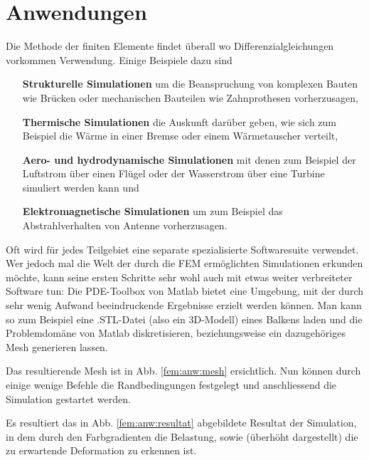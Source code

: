 %
%
%
%
\section{Anwendungen\label{fem:section:anwendungen}}

Die Methode der finiten Elemente findet überall wo Differenzialgleichungen vorkommen Verwendung.
Einige Beispiele dazu sind
\begin{itemize}
    \item [\textbf{Strukturelle Simulationen}] um die Beanspruchung von komplexen Bauten wie Brücken oder mechanischen Bauteilen wie Zahnprothesen vorherzusagen,
    \item [\textbf{Thermische Simulationen}] die Auskunft darüber geben, wie sich zum Beispiel die Wärme in einer Bremse oder einem Wärmetauscher verteilt,
    \item [\textbf{Aero- und hydrodynamische Simulationen}] mit denen zum Beispiel der Luftstrom über einen Flügel oder der Wasserstrom über eine Turbine simuliert werden kann und
    \item [\textbf{Elektromagnetische Simulationen}] um zum Beispiel das Abstrahlverhalten von Antenne vorherzusagen.
\end{itemize}

Oft wird für jedes Teilgebiet eine separate spezialisierte Softwaresuite verwendet.
Wer jedoch mal die Welt der durch die FEM ermöglichten Simulationen erkunden möchte, kann seine ersten Schritte sehr wohl auch mit etwas weiter verbreiteter Software tun: 
Die PDE-Toolbox von Matlab bietet eine Umgebung, mit der durch sehr wenig Aufwand beeindruckende Ergebnisse erzielt werden können.
Man kann so zum Beispiel eine .STL-Datei (also ein 3D-Modell) eines Balkens laden und die Problemdomäne von Matlab diskretisieren, beziehungsweise ein dazugehöriges Mesh generieren lassen. 

Das resultierende Mesh ist in Abb. \ref{fem:anw:mesh} ersichtlich.
Nun können durch einige wenige Befehle die Randbedingungen festgelegt und anschliessend die Simulation gestartet werden.

Es resultiert das in Abb. \ref{fem:anw:resultat} abgebildete Resultat der Simulation, in dem durch den Farbgradienten die Belastung, sowie (überhöht dargestellt) die zu erwartende Deformation zu erkennen ist.